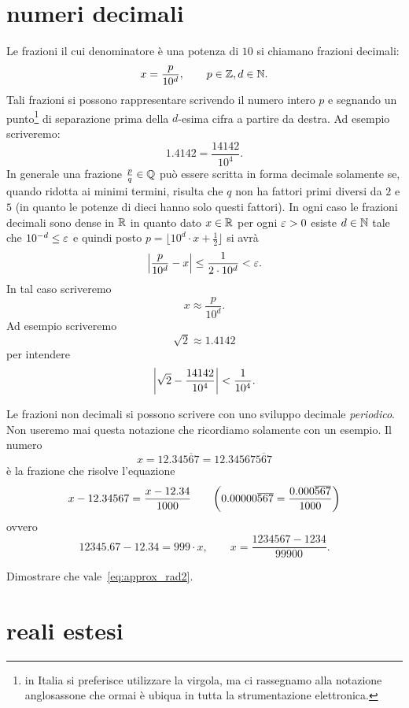 \section{numeri decimali}
%
Le frazioni il cui denominatore è una potenza
di $10$ si chiamano frazioni decimali:
\[
  x = \frac{p}{10^d}, \qquad p\in \mathbb Z, d\in \mathbb N.
\]
Tali frazioni si possono rappresentare
scrivendo il numero
intero $p$ e segnando un punto\footnote{%
in Italia si preferisce utilizzare la virgola, ma
ci rassegnamo alla notazione anglosassone che ormai è
ubiqua in tutta la strumentazione elettronica.
}
di separazione
prima della $d$-esima cifra a partire da destra.
Ad esempio scriveremo:
\[
  1.4142 = \frac{14142}{10^4}.
\]
In generale una frazione $\frac{p}{q}\in \mathbb Q$
può essere scritta in forma decimale solamente
se, quando ridotta ai minimi termini,
risulta che $q$ non ha fattori primi diversi
da $2$ e $5$ (in quanto le potenze di dieci
hanno solo questi fattori).
In ogni caso le frazioni decimali sono dense in $\mathbb R$
in quanto dato $x\in \mathbb R$ per ogni $\varepsilon>0$ esiste
$d\in \mathbb N$ tale che $10^{-d}\le\varepsilon$ e quindi
posto $p=\lfloor 10^d\cdot x + \frac 1 2\rfloor$
si avrà
\[
    {\left|\frac{p}{10^d} - x\right|} \le \frac{1}{2\cdot 10^d} < \varepsilon.
\]
In tal caso scriveremo
\[
  x \approx \frac{p}{10^d}.
\]
Ad esempio scriveremo
\[
  \sqrt 2 \approx 1.4142
\]
per intendere
\begin{equation}\label{eq:approx_rad2}
{\left|\sqrt 2 - \frac{14142}{10^4}\right|}<\frac{1}{10^4}.
\end{equation}

Le frazioni non decimali si possono scrivere con uno sviluppo
decimale \emph{periodico}. Non useremo mai questa notazione
che ricordiamo solamente con un esempio.
Il numero
\[
  x = 12.34\overline{567}
    = 12.34567\overline{567}
\]
è la frazione che risolve l'equazione
\[
  x-12.34567 = \frac{x - 12.34}{1000}
  \qquad
{\left( 0.00000\overline{567} = \frac{0.000\overline{567}}{1000} \right)}
\]
ovvero
\[
  12345.67 - 12.34 = 999 \cdot x,
  \qquad x = \frac{1234567-1234}{99900}.
\]

\begin{exercise}
Dimostrare che vale~\eqref{eq:approx_rad2}.
\end{exercise}

\section{reali estesi}


